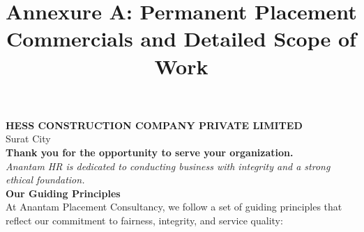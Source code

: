 \documentclass{article}
\title{\textbf{\color{primary} Annexure A: Permanent Placement Commercials and Detailed Scope of Work}}
\date{}
\begin{document}
\maketitle

\noindent\textbf{HESS CONSTRUCTION COMPANY PRIVATE LIMITED}\\
Surat City\\[1em]

\noindent\textbf{Thank you for the opportunity to serve your organization.}\\[0.5em]
\noindent\textit{Anantam HR is dedicated to conducting business with integrity and a strong ethical foundation.}\\[1em]

\noindent\textbf{\color{secondary} Our Guiding Principles}\\[0.5em]
\noindent At Anantam Placement Consultancy, we follow a set of guiding principles that reflect our commitment to fairness, integrity, and service quality:
\end{document}
